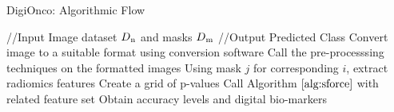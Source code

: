 \documentclass[10pt,final,1p,times,twocolumn]{elsarticle}
\begin{document}
\begin{algorithm}[!t]
\caption{DigiOnco: Algorithmic Flow}\label{main}
\begin{algorithmic}[1]
\footnotesize
\STATE //Input Image dataset $D\textsubscript{n}$ and masks $D\textsubscript{m}$ 
\STATE //Output Predicted Class
\STATE Convert image to a suitable format using conversion software
\STATE Call the pre-processsing techniques on the formatted images
\STATE Using mask $j$ for corresponding $i$, extract radiomics features
\STATE Create a grid of p-values
\STATE Call Algorithm $\ref{alg:sforce}$ with related feature set
\ENDFOR
\STATE Obtain accuracy levels and digital bio-markers
\ENDFOR
\end{algorithmic}
\end{algorithm}



\end{document}
